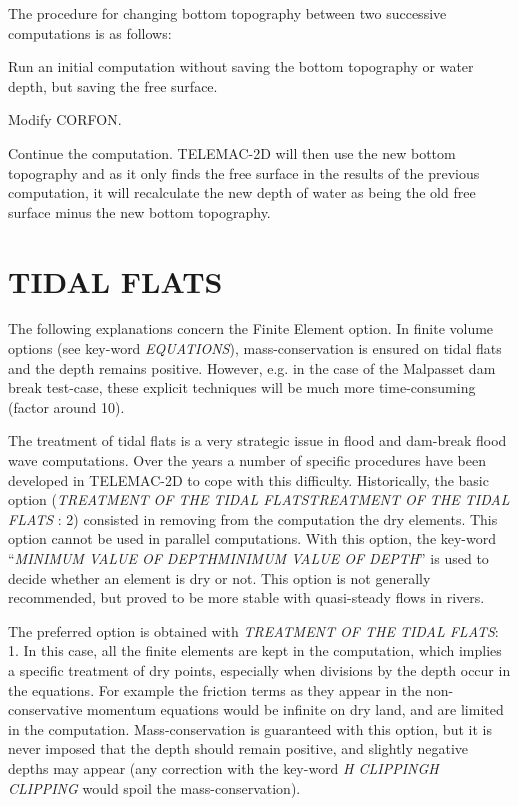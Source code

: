  The procedure for changing bottom topography between two successive computations is as follows:

 Run an initial computation without saving the bottom topography or water depth, but saving the free surface.

 Modify CORFON.

 Continue the computation. TELEMAC-2D will then use the new bottom topography and as it only finds the free surface in the results of the previous computation, it will recalculate the new depth of water as being the old free surface minus the new bottom topography.




\section{  TIDAL FLATS}

 The following explanations concern the Finite Element option. In finite volume options (see key-word \textit{EQUATIONS}), mass-conservation is ensured on tidal flats and the depth remains positive. However, e.g. in the case of the Malpasset dam break test-case, these explicit techniques will be much more time-consuming (factor around 10).

 The treatment of tidal flats is a very strategic issue in flood and dam-break flood wave computations. Over the years a number of specific procedures have been developed in TELEMAC-2D to cope with this difficulty. Historically, the basic option (\textit{TREATMENT OF THE TIDAL FLATSTREATMENT OF THE TIDAL FLATS} : 2) consisted in removing from the computation the dry elements. This option cannot be used in parallel computations. With this option, the key-word ``\textit{MINIMUM VALUE OF DEPTHMINIMUM VALUE OF DEPTH}'' is used to decide whether an element is dry or not. This option is not generally recommended, but proved to be more stable with quasi-steady flows in rivers.

 The preferred option is obtained with \textit{TREATMENT OF THE TIDAL FLATS}: 1. In this case, all the finite elements are kept in the computation, which implies a specific treatment of dry points, especially when divisions by the depth occur in the equations. For example the friction terms as they appear in the non-conservative momentum equations would be infinite on dry land, and are limited in the computation. Mass-conservation is guaranteed with this option, but it is never imposed that the depth should remain positive, and slightly negative depths may appear (any correction with the key-word \textit{H CLIPPINGH CLIPPING} would spoil the mass-conservation).

